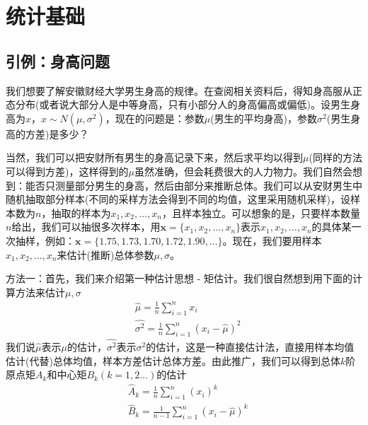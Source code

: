 
\chapter{统计基础}
\section{引例：身高问题}
    \par
    我们想要了解安徽财经大学男生身高的规律。在查阅相关资料后，得知身高服从正态分布(或者说大部分人是中等身高，只有小部分人的身高偏高或偏低)。设男生身高为$x$，$x \sim N(\mu,\sigma^2)$，现在的问题是：参数$\mu$(男生的平均身高)，参数$\sigma^2$(男生身高的方差)是多少？
    \par
    当然，我们可以把安财所有男生的身高记录下来，然后求平均以得到$\mu$(同样的方法可以得到方差)，这样得到的$\mu$虽然准确，但会耗费很大的人力物力。我们自然会想到：能否只测量部分男生的身高，然后由部分来推断总体。我们可以从安财男生中随机抽取部分样本(不同的采样方法会得到不同的均值，这里采用随机采样)，设样本数为$n$，抽取的样本为$x_1,x_2,\dots,x_n$，且样本独立。可以想象的是，只要样本数量$n$给出，我们可以抽很多次样本，用$\mathbf{x} = \{x_1,x_2,\dots,x_n\}$表示$x_1,x_2,\dots,x_n$的具体某一次抽样，例如：$\mathbf{x} = \{1.75,1.73,1.70,1.72,1.90,\dots\}$。现在，我们要用样本$x_1,x_2,\dots,x_n$来估计(推断)总体参数$\mu,\sigma$。
    \par
    方法一：首先，我们来介绍第一种估计思想 - 矩估计。我们很自然想到用下面的计算方法来估计$\mu,\sigma$
    \begin{align*}
      &\hat{\mu} = \frac{1}{n}\sum_{i = 1}^n x_i\\
      &\hat{\sigma^2} = \frac{1}{n}\sum_{i = 1}^n (x_i - \hat{\mu})^2
    \end{align*}
    我们说$\hat{\mu}$表示$\mu$的估计，$\hat{\sigma^2}$表示$\sigma^2$的估计，这是一种直接估计法，直接用样本均值估计(代替)总体均值，样本方差估计总体方差。由此推广，我们可以得到总体$k$阶原点矩$A_k$和中心矩$B_k(k = 1,2\dots)$的估计
    \begin{align*}
    &\hat{A}_k = \frac{1}{n} \sum_{i = 1}^n (x_i)^k\\
    &\hat{B}_k = \frac{1}{n-1} \sum_{i = 1}^n (x_i - \hat{\mu})^k
    \end{align*}
